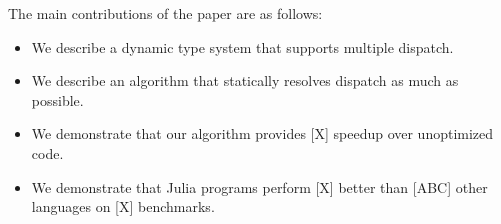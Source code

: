 The main contributions of the paper are as follows:
\begin{itemize}
\item We describe a dynamic type system that supports multiple dispatch.
\item We describe an algorithm that statically resolves dispatch as much as possible.
\item We demonstrate that our algorithm provides [X] speedup over unoptimized code.
\item We demonstrate that Julia programs perform [X] better than [ABC] other languages on [X] benchmarks.
\end{itemize}

%



